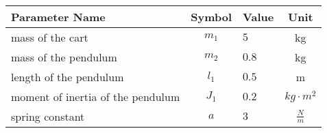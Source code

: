 \begin{tabular}{lclc}
\hline
 Parameter Name                    &  Symbol  & Value   &      Unit      \\
\hline
 mass of the cart                  & $m_{1}$  & $5$     &       kg       \\
 mass of the pendulum              & $m_{2}$  & $0.8$   &       kg       \\
 length of the pendulum            & $l_{1}$  & $0.5$   &       m        \\
 moment of inertia of the pendulum & $J_{1}$  & $0.2$   & $kg \cdot m^2$ \\
 spring constant                   &   $a$    & $3$     & $\frac{N}{m}$  \\
\hline
\end{tabular}